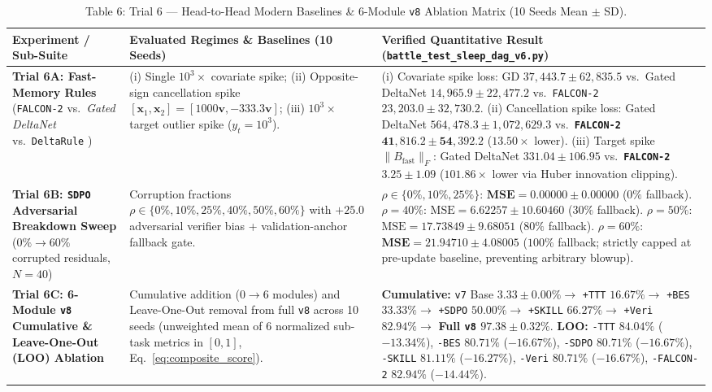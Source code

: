 \documentclass[11pt,a4paper]{article}
\begin{document}
\begin{table}[ht!]
\centering
\caption{Table 6: Trial 6 --- Head-to-Head Modern Baselines \& 6-Module \texttt{v8} Ablation Matrix (10 Seeds Mean $\pm$ SD).}
\label{tab:trial6_ablations}
\footnotesize
\begin{tabular}{p{3.6cm}p{5.8cm}p{6.0cm}}
\toprule
\textbf{Experiment / Sub-Suite} & \textbf{Evaluated Regimes \& Baselines (10 Seeds)} & \textbf{Verified Quantitative Result (\texttt{battle\_test\_sleep\_dag\_v6.py})} \\
\midrule
\textbf{Trial 6A: Fast-Memory Rules} (\texttt{FALCON-2} \cite{falcon2_2026} vs.\ \emph{Gated DeltaNet} \cite{yang2025} vs.\ \texttt{DeltaRule} \cite{schlag2021}) & (i) Single $10^3\times$ covariate spike; (ii) Opposite-sign cancellation spike $[\mathbf{x}_1, \mathbf{x}_2] = [1000\mathbf{v}, -333.3\mathbf{v}]$; (iii) $10^3\times$ target outlier spike ($y_t = 10^3$). & (i) Covariate spike loss: GD $37,443.7 \pm 62,835.5$ vs.\ Gated DeltaNet $14,965.9 \pm 22,477.2$ vs.\ \texttt{FALCON-2} $23,203.0 \pm 32,730.2$. \newline (ii) Cancellation spike loss: Gated DeltaNet $564,478.3 \pm 1,072,629.3$ vs.\ \textbf{\texttt{FALCON-2} $\mathbf{41,816.2 \pm 54,392.2}$} ($\mathbf{13.50\times}$ lower). \newline (iii) Target spike $\|B_{\text{fast}}\|_F$: Gated DeltaNet $331.04 \pm 106.95$ vs.\ \textbf{\texttt{FALCON-2} $\mathbf{3.25 \pm 1.09}$} ($\mathbf{101.86\times}$ lower via Huber innovation clipping). \\
\addlinespace
\textbf{Trial 6B: \texttt{SDPO} Adversarial Breakdown Sweep} ($0\% \to 60\%$ corrupted residuals, $N=40$) & Corruption fractions $\rho \in \{0\%, 10\%, 25\%, 40\%, 50\%, 60\%\}$ with $+25.0$ adversarial verifier bias + validation-anchor fallback gate. & $\rho \in \{0\%, 10\%, 25\%\}$: $\mathbf{\text{MSE} = 0.00000 \pm 0.00000}$ ($0\%$ fallback). \newline $\rho = 40\%$: $\text{MSE} = 6.62257 \pm 10.60460$ ($30\%$ fallback). \newline $\rho = 50\%$: $\text{MSE} = 17.73849 \pm 9.68051$ ($80\%$ fallback). \newline $\rho = 60\%$: $\mathbf{\text{MSE} = 21.94710 \pm 4.08005}$ ($100\%$ fallback; strictly capped at pre-update baseline, preventing arbitrary blowup). \\
\addlinespace
\textbf{Trial 6C: 6-Module \texttt{v8} Cumulative \& Leave-One-Out (LOO) Ablation} & Cumulative addition ($0 \to 6$ modules) and Leave-One-Out removal from full \texttt{v8} across 10 seeds (unweighted mean of 6 normalized sub-task metrics in $[0, 1]$, Eq.~\eqref{eq:composite_score}). & \textbf{Cumulative:} \texttt{v7} Base $3.33 \pm 0.00\% \to$ \texttt{+TTT} $16.67\% \to$ \texttt{+BES} $33.33\% \to$ \texttt{+SDPO} $50.00\% \to$ \texttt{+SKILL} $66.27\% \to$ \texttt{+Veri} $82.94\% \to$ \textbf{Full \texttt{v8} $\mathbf{97.38 \pm 0.32\%}$}. \newline \textbf{LOO:} \texttt{-TTT} $84.04\%$ ($-13.34\%$), \texttt{-BES} $80.71\%$ ($-16.67\%$), \texttt{-SDPO} $80.71\%$ ($-16.67\%$), \texttt{-SKILL} $81.11\%$ ($-16.27\%$), \texttt{-Veri} $80.71\%$ ($-16.67\%$), \texttt{-FALCON-2} $82.94\%$ ($-14.44\%$). \\

\end{tabular}
\end{table}
\end{document}
